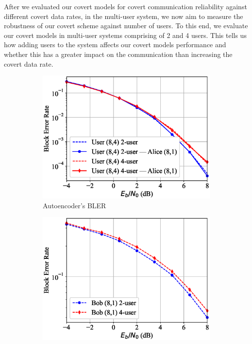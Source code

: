 After we evaluated our covert models for covert communication reliability against different covert data rates, in the multi-user system, we now aim to measure the robustness of our covert scheme against number of users. To this end, we evaluate our covert models in multi-user systems comprising of 2 and 4 users. This tells us how adding users to the system affects our covert models performance and whether this has a greater impact on the communication than increasing the covert data rate.

\begin{figure}[tp!]
	\begin{subfigure}{0.28\textwidth}
		\includegraphics[width=\linewidth]{figs/multi_covert_autoencoder_bler_awgn}
		\caption{Autoencoder's BLER}
		\label{fig:multi_awgn_results_ae}
	\end{subfigure}
	\hspace*{\fill}
	\begin{subfigure}{0.28\textwidth}
		\includegraphics[width=\linewidth]{figs/multi_bob_bler_awgn}

\end{subfigure}
\end{figure}
